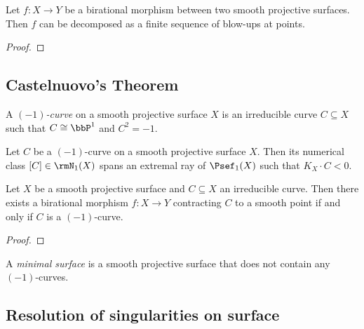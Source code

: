     \begin{theorem}%
        Let \(f:X \to Y\) be a birational morphism between two smooth projective surfaces.
        Then \(f\) can be decomposed as a finite sequence of blow-ups at points.
    \end{theorem}
    \begin{proof}
    \end{proof}

\subsection{Castelnuovo's Theorem}

    \begin{definition}%
        A \emph{\((-1)\)-curve} on a smooth projective surface \(X\) is an irreducible curve \(C\subseteq X\) such that \(C\cong \bbP^1\) and \(C^2=-1\).
    \end{definition}

    \begin{remark}%
        Let \(C\) be a \((-1)\)-curve on a smooth projective surface \(X\).
        Then its numerical class \([C]\in \rmN_1(X)\) spans an extremal ray of \(\Psef_1(X)\) such that \(K_X\cdot C < 0\).
    \end{remark}

    \begin{theorem}%
        Let \(X\) be a smooth projective surface and \(C\subseteq X\) an irreducible curve.
        Then there exists a birational morphism \(f:X\to Y\) contracting \(C\) to a smooth point if and only if \(C\) is a \((-1)\)-curve.
    \end{theorem}
    \begin{proof}
    \end{proof}

    \begin{definition}%
        A \emph{minimal surface} is a smooth projective surface that does not contain any \((-1)\)-curves.
    \end{definition}

\subsection{Resolution of singularities on surface}

